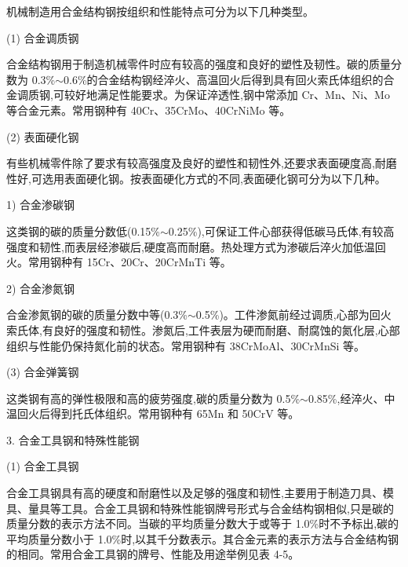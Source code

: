 \documentclass[UTF8]{ctexbook}
\newcommand{\◎}{\ensuremath{\bigcirc}}
\begin{document}
机械制造用合金结构钢按组织和性能特点可分为以下几种类型。

(1) 合金调质钢

合金结构钢用于制造机械零件时应有较高的强度和良好的塑性及韧性。碳的质量分数为 0.3\%$\sim$0.6\%的合金结构钢经淬火、高温回火后得到具有回火索氏体组织的合金调质钢,可较好地满足性能要求。为保证淬透性,钢中常添加 Cr、Mn、Ni、Mo 等合金元素。常用钢种有 40Cr、35CrMo、40CrNiMo 等。

(2) 表面硬化钢

有些机械零件除了要求有较高强度及良好的塑性和韧性外,还要求表面硬度高,耐磨性好,可选用表面硬化钢。按表面硬化方式的不同,表面硬化钢可分为以下几种。

1) 合金渗碳钢

这类钢的碳的质量分数低(0.15\%$\sim$0.25\%),可保证工件心部获得低碳马氏体,有较高强度和韧性,而表层经渗碳后,硬度高而耐磨。热处理方式为渗碳后淬火加低温回火。常用钢种有 15Cr、20Cr、20CrMnTi 等。

2) 合金渗氮钢

合金渗氮钢的碳的质量分数中等(0.3\%$\sim$0.5\%)。工件渗氮前经过调质,心部为回火索氏体,有良好的强度和韧性。渗氮后,工件表层为硬而耐磨、耐腐蚀的氮化层,心部组织与性能仍保持氮化前的状态。常用钢种有 38CrMoAl、30CrMnSi 等。

(3) 合金弹簧钢

这类钢有高的弹性极限和高的疲劳强度,碳的质量分数为 0.5\%$\sim$0.85\%,经淬火、中温回火后得到托氏体组织。常用钢种有 65Mn 和 50CrV 等。

3. 合金工具钢和特殊性能钢

(1) 合金工具钢

合金工具钢具有高的硬度和耐磨性以及足够的强度和韧性,主要用于制造刀具、模具、量具等工具。合金工具钢和特殊性能钢牌号形式与合金结构钢相似,只是碳的质量分数的表示方法不同。当碳的平均质量分数大于或等于 1.0\%时不予标出,碳的平均质量分数小于 1.0\%时,以其千分数表示。其合金元素的表示方法与合金结构钢的相同。常用合金工具钢的牌号、性能及用途举例见表 4-5。
\end{document}
